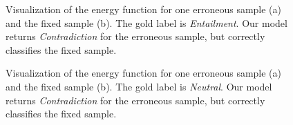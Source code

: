\documentclass[11pt,a4paper]{article}
\begin{document}
	
	\begin{figure}[ht]
		\begin{center}
		\end{center}
		\caption{
			Visualization of the energy function for one erroneous sample (a) and the fixed sample (b). The gold label is \emph{Entailment}. Our model returns \emph{Contradiction} for the erroneous sample, but correctly classifies the fixed sample.
		}
		\label{fig:att:miss1}
	\end{figure}
	
	\begin{figure}[ht]
		\begin{center}
		\end{center}
		\caption{
			Visualization of the energy function for one erroneous sample (a) and the fixed sample (b). The gold label is \emph{Neutral}. Our model returns \emph{Contradiction} for the erroneous sample, but correctly classifies the fixed sample.
		}
		\label{fig:att:miss2}
	\end{figure}
	
\end{document}
